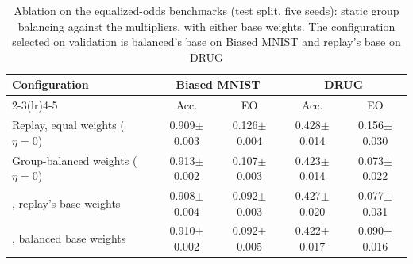 \begin{table}[t]
\centering
\caption{Ablation on the equalized-odds benchmarks (test split, five seeds): static group balancing against the multipliers, with either base weights. The configuration selected on validation is balanced's base on Biased MNIST and replay's base on DRUG}\label{tab:ablation-eo}
\footnotesize
\setlength{\tabcolsep}{4pt}
\begin{tabular}{lcccc}
\toprule
Configuration & \multicolumn{2}{c}{Biased MNIST} & \multicolumn{2}{c}{DRUG} \\ \cmidrule(lr){2-3}\cmidrule(lr){4-5} & Acc. & EO & Acc. & EO \\
\midrule
Replay, equal weights ($\eta = 0$) & 0.909\tiny{$\pm$0.003} & 0.126\tiny{$\pm$0.004} & 0.428\tiny{$\pm$0.014} & 0.156\tiny{$\pm$0.030} \\
Group-balanced weights ($\eta = 0$) & 0.913\tiny{$\pm$0.002} & 0.107\tiny{$\pm$0.003} & 0.423\tiny{$\pm$0.014} & 0.073\tiny{$\pm$0.022} \\
\method{}, replay's base weights & 0.908\tiny{$\pm$0.004} & 0.092\tiny{$\pm$0.003} & 0.427\tiny{$\pm$0.020} & 0.077\tiny{$\pm$0.031} \\
\method{}, balanced base weights & 0.910\tiny{$\pm$0.002} & 0.092\tiny{$\pm$0.005} & 0.422\tiny{$\pm$0.017} & 0.090\tiny{$\pm$0.016} \\
\bottomrule
\end{tabular}
\end{table}
